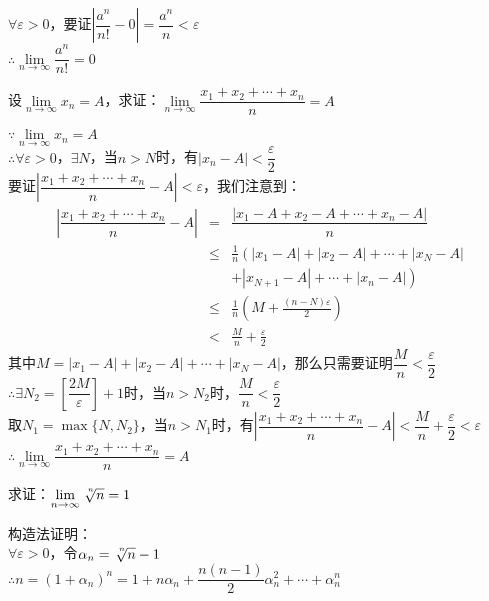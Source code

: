 \documentclass[11pt,fleqn]{book} %
\begin{document}
\begin{enumerate}
\begin{prove}
 $\forall \varepsilon > 0$，要证$\left|\dfrac{a^n}{n!}-0\right|=\dfrac{a^n}{n}<\varepsilon$\\
$\therefore \lim\limits_{n\rightarrow \infty} \dfrac{a^n}{n!}=0$
\end{prove}
\begin{example}
  设$\lim\limits_{n\rightarrow \infty} x_n=A$，求证：$\lim\limits_{n\rightarrow \infty} \dfrac{x_1+x_2+\cdots+x_n}{n}=A$
\end{example}
\begin{prove}
 $\because \lim\limits_{n\rightarrow \infty} x_n=A$\\
$\therefore \forall \varepsilon>0$，$\exists N$，当$n>N$时，有$|x_n-A|<\dfrac{\varepsilon}{2}$\\
要证$\left|\dfrac{x_1+x_2+\cdots+x_n}{n}-A\right|<\varepsilon$，我们注意到：
\begin{eqnarray*}
  \left|\dfrac{x_1+x_2+\cdots+x_n}{n}-A\right| &=&  \dfrac{\left|x_1-A+x_2-A+\cdots+x_n-A\right|}{n} \\
   &\leqslant& \frac{1}{n}\left(|x_1-A|+|x_2-A|+\cdots+|x_N-A|\right.\\
&&+\left.|x_{N+1}-A|+\cdots+|x_n-A|\right) \\
   &\leqslant& \frac{1}{n} \left(M+\frac{(n-N)\varepsilon}{2}\right)\\
&<&\frac{M}{n}+\frac{\varepsilon}{2}
\end{eqnarray*}
其中$M=|x_1-A|+|x_2-A|+\cdots+|x_N-A|$，那么只需要证明$\dfrac{M}{n}<\dfrac{\varepsilon}{2}$\\
$\therefore \exists N_2 = \left[\dfrac{2M}{\varepsilon}\right]+1$时，当$n>N_2$时，$\dfrac{M}{n}<\dfrac{\varepsilon}{2}$\\
取$N_1=\max\{N, N_2\}$，当$n>N_1$时，有$\left|\dfrac{x_1+x_2+\cdots+x_n}{n}-A\right|<\dfrac{M}{n}+\dfrac{\varepsilon}{2}<\varepsilon$\\
$\therefore \lim\limits_{n\rightarrow \infty} \dfrac{x_1+x_2+\cdots+x_n}{n}=A$
\end{prove}
\begin{example}
  求证：$\lim\limits_{n\rightarrow \infty} \sqrt[\leftroot{-2}\uproot{4}n]{n}=1$
\end{example}
\begin{prove}
 构造法证明：\\$\forall \varepsilon > 0$，令$\alpha_n = \sqrt[\leftroot{-2}\uproot{4}n]{n}-1$\\
$\therefore n = (1+\alpha_n)^n=1+n\alpha_n+\dfrac{n(n-1)}{2}\alpha_n^2+\cdots+\alpha_n^n$\\

\end{prove}
\end{enumerate}
\end{document}
